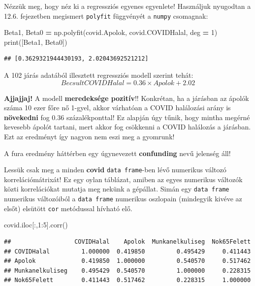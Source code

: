 \documentclass[
]{book}
\newenvironment{Shaded}{\begin{snugshade}}{\end{snugshade}}
\newcommand{\BuiltInTok}[1]{#1}
\newcommand{\DecValTok}[1]{\textcolor[rgb]{0.00,0.00,0.81}{#1}}
\newcommand{\NormalTok}[1]{#1}
\newcommand{\OperatorTok}[1]{\textcolor[rgb]{0.81,0.36,0.00}{\textbf{#1}}}
\begin{document}
Nézzük meg, hogy néz ki a regressziós egyenes egyenlete! Használjuk nyugodtan a 12.6. fejezetben megismert \texttt{polyfit} függvényét a \texttt{numpy} csomagnak:

\begin{Shaded}
\begin{Highlighting}[]
\NormalTok{Beta1, Beta0 }\OperatorTok{=}\NormalTok{ np.polyfit(covid.Apolok, covid.COVIDHalal, deg }\OperatorTok{=} \DecValTok{1}\NormalTok{)}
\BuiltInTok{print}\NormalTok{([Beta1, Beta0])}
\end{Highlighting}
\end{Shaded}

\begin{verbatim}
## [0.3629321944430193, 2.02043692521212]
\end{verbatim}

A 102 járás adatából illesztett regressziós modell szerint tehát: \[Becsult COVIDHalal= 0.36 \times Apolok + 2.02\]

\textbf{Ajjajjaj!} A modell \textbf{meredeksége pozitív}!! Konkrétan, ha a járásban az ápolók száma 10 ezer főre nő 1-gyel, akkor várhatóan a COVID halálozási arány is \textbf{növekedni} fog 0.36 százalékponttal! Ez alapján úgy tűnik, hogy mintha megérné kevesebb ápolót tartani, mert akkor fog csökkenni a COVID halálozás a járásban. Ezt az eredményt így nagyon nem eszi meg a gyomrunk!

A fura eredmény háttérben egy úgynevezett \textbf{confunding} nevű jelenség áll!

Lessük csak meg a minden \textbf{covid} \texttt{data\ frame}-ben lévő numerikus változó korrelációmátrixát! Ez egy oylan táblázat, amiben az egyes numerikus változók közti korrelációkat mutatja meg nekünk a gépállat. Simán egy \texttt{data\ frame} numerikus változóiból a \texttt{data\ frame} numerikus oszlopain (mindegyik kivéve az elsőt) elsütött \texttt{cor} metódussal hívható elő.

\begin{Shaded}
\begin{Highlighting}[]
\NormalTok{covid.iloc[:,}\DecValTok{1}\NormalTok{:}\DecValTok{5}\NormalTok{].corr()}
\end{Highlighting}
\end{Shaded}

\begin{verbatim}
##                  COVIDHalal    Apolok  Munkanelkuliseg  Nok65Felett
## COVIDHalal         1.000000  0.419850         0.495429     0.411443
## Apolok             0.419850  1.000000         0.540570     0.517462
## Munkanelkuliseg    0.495429  0.540570         1.000000     0.228315
## Nok65Felett        0.411443  0.517462         0.228315     1.000000
\end{verbatim}
\end{document}
